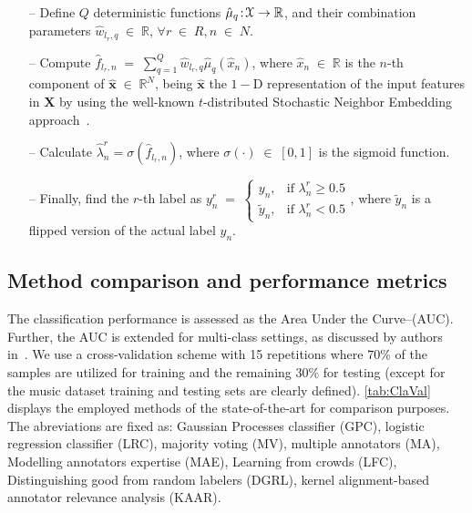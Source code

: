 \documentclass[journal]{IEEEtran}
\providecommand{\ve}[1]{{\bm{#1}}}%
\providecommand{\mat}[1]{{\bm{#1}}} %
\newcommand{\Real}{\mathbb{R}}
\DeclareMathOperator{\en}{\!\,\in\!\,}
\DeclareMathOperator{\igual}{\!\,=\!\,}
\providecommand{\s}[1]{\negthinspace#1\negthinspace}%
\providecommand{\ve}[1]{{\mathbf{#1}}}
\providecommand{\mat}[1]{{\mathbf{#1}}}
\begin{document}
\begin{itemize}
    \item [--] Define $Q$ deterministic functions $\hat{\mu}_q\s{:}\mathcal{X}\to\Real$, and their combination parameters $\hat{w}_{l_r,q}\en \Real$, $\forall r\en R, n\en N$.
    \item[--] Compute $\hat{f}_{l_r,n}\igual \sum_{q=1}^{Q}\hat{w}_{l_r,q}\hat{\mu}_q(\hat{x}_n)$, where $\hat{x}_n\en\Real$ is the $n$-th component of $\hat{\ve{x}}\en \Real^N$, being $\hat{\ve{x}}$ the $1-$D representation of the input features in $\mat{X}$ by using the well-known $t$-distributed Stochastic Neighbor Embedding approach~\cite{maaten2008visualizing}.
    \item[--] Calculate $\hat{\lambda}_{n}^r = \sigma(\hat{f}_{l_r,n})$, where $\sigma(\cdot)\en[0,1]$ is the sigmoid function.
    \item[--] Finally, find the $r$-th label as $y_n^r \igual \begin{cases}y_n, &\mbox{if }\lambda_{n}^r \ge 0.5\\ \tilde{y}_n, & \mbox{if }\lambda_{n}^r <0.5 \end{cases}$, where $\tilde{y}_n$ is a flipped version of the actual label $y_n$.
\end{itemize}

\subsection{Method comparison and performance metrics}

The classification performance is assessed as the Area Under the Curve--(AUC). Further, the AUC is extended for multi-class settings, as discussed by authors in~\cite{fawcett2006introduction}. We use a cross-validation scheme with 15 repetitions where $70$\% of the samples are utilized for training and the remaining $30\%$ for testing (except for the music dataset training and testing sets are clearly defined). \cref{tab:ClaVal} displays the employed methods of the state-of-the-art for comparison purposes. The abreviations are fixed as: Gaussian Processes classifier (GPC), logistic regression classifier (LRC), majority voting (MV), multiple annotators (MA), Modelling annotators expertise (MAE), Learning from crowds (LFC), Distinguishing good from random labelers (DGRL), kernel alignment-based annotator relevance analysis (KAAR).
\end{document}
